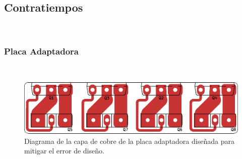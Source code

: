 \subsection{Contratiempos}

\lipsum[1]\\

\subsubsection{Placa Adaptadora}

\lipsum[2]\\

\begin{figure}[h]
    \centering
    \includegraphics[scale=1]{Imagenes/Placa Adaptadora.pdf}
    \caption{Diagrama de la capa de cobre de la placa adaptadora diseñada para mitigar el error de diseño.}
    \label{placa_adaptadora}
\end{figure}